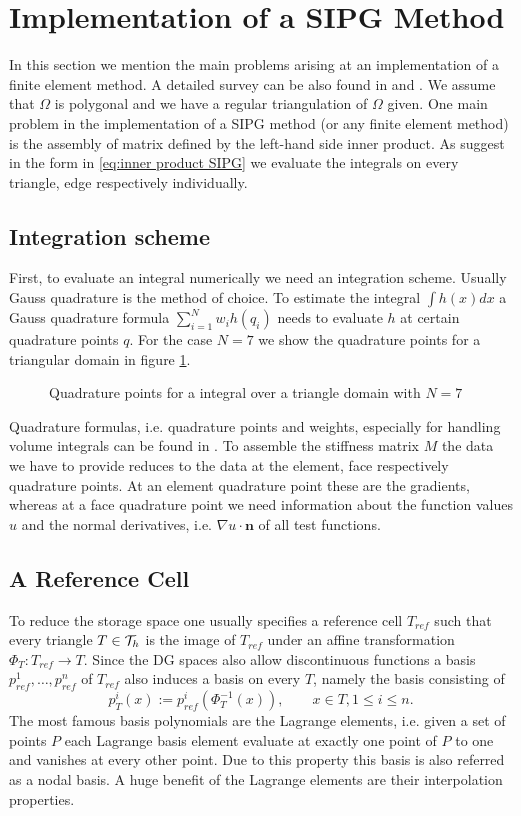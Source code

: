 \section{Implementation of a SIPG Method}

In this section we mention the main problems arising at an implementation of a finite element method. A detailed survey can be also found in \cite[Section 0.6]{BS2002} and \cite[Chapter 8]{Braess2003}.
We assume that $\Omega$ is polygonal and we have a regular triangulation of $\Omega$ given. One main problem in the implementation of a SIPG method (or any finite element method) is the assembly of matrix defined by the left-hand side inner product. As suggest in the form in \eqref{eq:inner product SIPG} we evaluate the integrals on every triangle, edge respectively individually.

\subsection{Integration scheme}
First, to evaluate an integral numerically we need an integration scheme. Usually Gauss quadrature is the method of choice. To estimate the integral $\int h(x) dx$ a Gauss quadrature formula $\sum_{i=1}^{N} w_i h(q_i)$ needs to evaluate $h$ at certain quadrature points $q$. For the case $N=7$ we show the quadrature points for a triangular domain in figure \ref{fig: quadrature}.
\begin{figure}[!h]
	\centering
	
	\caption{Quadrature points for a integral over a triangle domain with $N=7$}
	 \label{fig: quadrature}
\end{figure}
Quadrature formulas, i.e. quadrature points and weights, especially for handling volume integrals can be found in \cite{Strout1971}.
To assemble the stiffness matrix $M$ the data we have to provide reduces to the data at the element, face respectively quadrature points.  
At an element quadrature point these are the gradients, whereas at a face quadrature point we need information about  the function values $u$ and the normal derivatives, i.e. $\nabla u \cdot \mathbf{n}$ of all test functions.

\subsection{A Reference Cell}
To reduce the storage space one usually specifies a reference cell $T_{ref}$ such that every triangle $T \in \mathcal{T}_h$ is the image of $T_{ref}$ under an affine transformation $\Phi_T:T_{ref} \rightarrow T$. 
Since the DG spaces also allow discontinuous functions a basis $p^1_{ref},\dots,p^n_{ref}$ of $T_{ref}$ also induces a basis on every $T$, namely the basis consisting of 
\[
	p_T^i(x) := p^i_{ref}(\Phi_T^{-1}(x)), \qquad x \in T, 1 \leq i \leq n.
\]
The most famous basis polynomials are the Lagrange elements, i.e. given a set of points $P$ each Lagrange basis element evaluate at exactly one point of $P$ to one and vanishes at every other point. Due to this property this basis is also referred as a nodal basis. 
A huge benefit of the Lagrange elements are their interpolation properties. 

